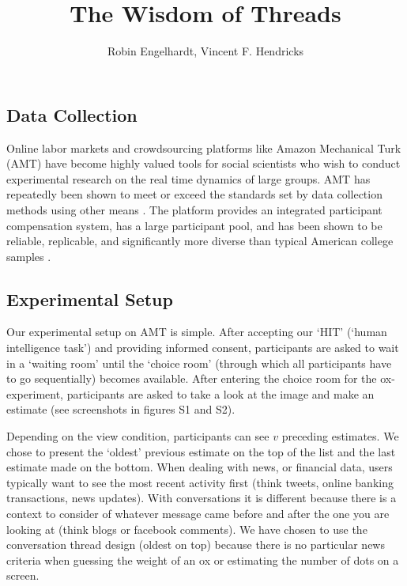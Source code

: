 \documentclass[9pt,twoside,lineno]{pnas-new}
\title{The Wisdom of Threads}
\author{Robin Engelhardt, Vincent F. Hendricks}
\begin{document}

\maketitle

\SItext

\subsection*{Data Collection}
Online labor markets and crowdsourcing platforms like Amazon Mechanical Turk (AMT) have become highly valued tools for social scientists who wish to conduct experimental research on the real time dynamics of large groups. AMT has repeatedly been shown to meet or exceed the standards set by data collection methods using other means \cite{berinsky2012evaluating, buhrmester2018evaluation}. The platform provides an integrated participant compensation system, has a large participant pool, and has been shown to be reliable, replicable, and significantly more diverse than typical American college samples \cite{mason2009financial, buhrmester2011amazon, crump2013evaluating, rand2012promise, horton2011online}.

\subsection*{Experimental Setup}
Our experimental setup on AMT is simple. After accepting our ‘HIT’ (‘human intelligence task’) and providing informed consent, participants are asked to wait in a ‘waiting room’ until the ‘choice room’ (through which all participants have to go sequentially) becomes available. After entering the choice room for the ox-experiment, participants are asked to take a look at the image and make an estimate (see screenshots in figures S1 and S2).

Depending on the view condition, participants can see $v$ preceding estimates. We chose to present the ‘oldest’ previous estimate on the top of the list and the last estimate made on the bottom. When dealing with news, or financial data, users typically want to see the most recent activity first (think tweets, online banking transactions, news updates). With conversations it is different because there is a context to consider of whatever message came before and after the one you are looking at (think blogs or facebook comments). We have chosen to use the conversation thread design (oldest on top) because there is no particular news criteria when guessing the weight of an ox or estimating the number of dots on a screen.
\end{document}
